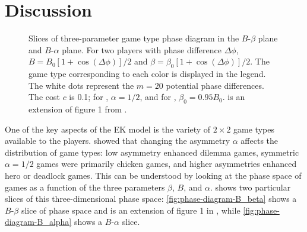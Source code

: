 \documentclass[pdflatex,lineno,referee,sn-mathphys-ay]{sn-jnl}
\begin{document}
\section{Discussion}
\label{sec:discussion}

\begin{figure}
  \centering
  
  \caption{
    Slices of three-parameter game type phase diagram
    in the
    $B$-$\beta$ plane
    and
    $B$-$\alpha$ plane.
    For two players with phase difference $\Delta \phi$,
    $B = B_0 [1 + \cos(\Delta \phi)]/2$
    and
    $\beta = \beta_0 [1 + \cos(\Delta \phi)]/2$.
    The game type corresponding to each color is displayed in the legend.
    The white dots represent the $m=20$ potential phase differences.
    The cost $c$ is \num{0.1};
    for
    ,
    $\alpha = 1/2$,
    and for
    ,
    $\beta_0 = \num{0.95} B_0$.
    is an extension of figure 1 from \citet{tripp2022evolutionary}.
  }
  \label{fig:phase-diagram}
\end{figure}

One of the key aspects of the EK model
is the variety of $2 \times 2$ game types available to the players.
 showed that changing the asymmetry $\alpha$
affects the distribution of game types:
low asymmetry enhanced dilemma games,
symmetric $\alpha = 1/2$ games were primarily chicken games,
and higher asymmetries enhanced hero or deadlock games.
This can be understood by looking at the phase space of games
as a function of the three parameters $\beta$, $B$, and $\alpha$.
 shows two particular slices
of this three-dimensional phase space:
\cref{fig:phase-diagram-B_beta} shows a $B$-$\beta$ slice of phase space
and is an extension of figure 1 in \citet{tripp2022evolutionary},
while \cref{fig:phase-diagram-B_alpha} shows a $B$-$\alpha$ slice.
\end{document}
